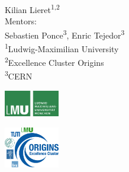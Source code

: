 \begin{frame}{}
	\begin{center}
		{
			{
				\Large \inserttitle
			}\\[0.7ex]
			{
				\large \insertsubtitle
			}
		}\\[2ex]
	   Kilian Lieret\textsuperscript{1,2}\\[2ex]
	   {
	   	\small
	   	Mentors:\\[0ex]
	    Sebastien Ponce\textsuperscript{3}, 
	    Enric Tejedor\textsuperscript{3}
	   }
	   \\[2.5 ex]
		{
			\footnotesize
			\textsuperscript{1}Ludwig-Maximilian University\\%
			\textsuperscript{2}Excellence Cluster Origins\\%
			\vspace{-0.5ex}\textsuperscript{3}CERN
		}\\[2.5ex]
		\insertdate
	\end{center}
	\vspace{6ex}
	\centering
	\newcommand\tmp{2.6cm}
	\newcommand\tmpp{2.4cm}
	\begin{changemargin}{-1cm}{-1cm}
	\centering
	{
		\begin{minipage}{\tmp}
		\includegraphics[width=\tmpp]{figures/logos/lmu_logo.pdf}
		\end{minipage}
	}
	{
		\begin{minipage}{\tmp}
			\includegraphics[width=\tmpp]{figures/logos/cluster.pdf}

\end{minipage}}
\end{changemargin}
\end{frame}
